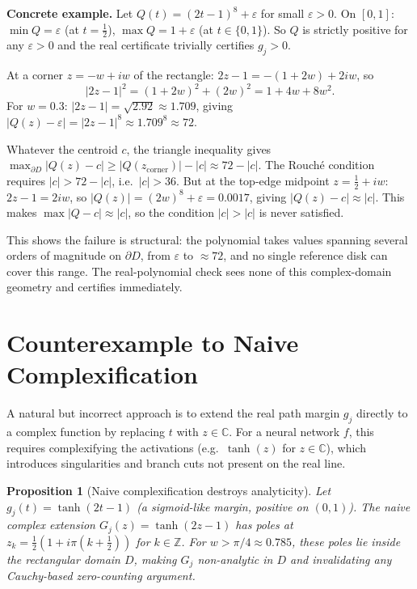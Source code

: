 \documentclass{article}
\newtheorem{proposition}{Proposition}
\theoremstyle{definition}
\newcommand{\abs}[1]{\left|#1\right|}
\begin{document}
\textbf{Concrete example.}
Let $Q(t) = (2t-1)^{8} + \varepsilon$ for small $\varepsilon > 0$.
On $[0,1]$: $\min Q = \varepsilon$ (at $t=\tfrac{1}{2}$), $\max Q = 1+\varepsilon$
(at $t\in\{0,1\}$).  So $Q$ is strictly positive for any $\varepsilon > 0$
and the real certificate trivially certifies $g_j > 0$.

At a corner $z = -w + iw$ of the rectangle:
$2z - 1 = -(1+2w) + 2iw$, so
\begin{equation}
  \abs{2z-1}^2 = (1+2w)^2 + (2w)^2 = 1 + 4w + 8w^2.
\end{equation}
For $w = 0.3$: $\abs{2z-1} = \sqrt{2.92} \approx 1.709$, giving
$\abs{Q(z)-\varepsilon} = \abs{2z-1}^{8} \approx 1.709^{8} \approx 72$.

Whatever the centroid $c$, the triangle inequality gives
$\max_{\partial D}\abs{Q(z)-c} \geq \abs{Q(z_{\text{corner}})} - \abs{c}
 \approx 72 - \abs{c}$.
The Rouch\'e condition requires $\abs{c} > 72 - \abs{c}$, i.e.\
$\abs{c} > 36$.  But at the top-edge midpoint $z = \tfrac{1}{2} + iw$:
$2z-1 = 2iw$, so $\abs{Q(z)} = (2w)^8 + \varepsilon = 0.0017$, giving
$\abs{Q(z)-c} \approx \abs{c}$.  This makes $\max\abs{Q-c} \approx \abs{c}$,
so the condition $\abs{c} > \abs{c}$ is never satisfied.

This shows the failure is structural: the polynomial takes values spanning
several orders of magnitude on $\partial D$, from $\varepsilon$ to $\approx 72$,
and no single reference disk can cover this range.  The real-polynomial check
sees none of this complex-domain geometry and certifies immediately.

\section{Counterexample to Naive Complexification}
\label{sec:counterexample}

A natural but incorrect approach is to extend the real path margin $g_j$
directly to a complex function by replacing $t$ with $z\in\mathbb{C}$.
For a neural network $f$, this requires complexifying the activations
(e.g.\ $\tanh(z)$ for $z\in\mathbb{C}$), which introduces singularities
and branch cuts not present on the real line.

\begin{proposition}[Naive complexification destroys analyticity]
  \label{prop:counterex}
  Let $g_j(t) = \tanh(2t-1)$ (a sigmoid-like margin, positive on $(0,1)$).
  The naive complex extension $G_j(z) = \tanh(2z-1)$ has poles at
  $z_k = \tfrac{1}{2}(1 + i\pi(k+\tfrac{1}{2}))$ for $k\in\mathbb{Z}$.
  For $w>\pi/4\approx 0.785$, these poles lie inside the rectangular domain
  $D$, making $G_j$ non-analytic in $D$ and invalidating any Cauchy-based
  zero-counting argument.
\end{proposition}
\end{document}
